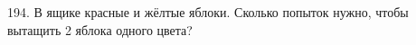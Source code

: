194. В ящике красные и жёлтые яблоки. Сколько попыток нужно, чтобы вытащить 2 яблока одного цвета?\\
